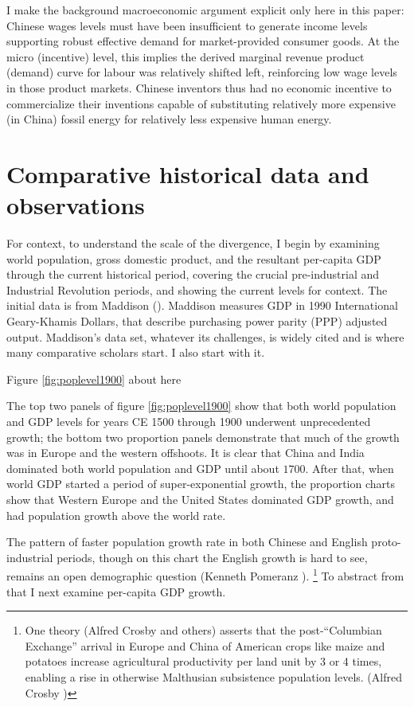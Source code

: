 \documentclass[12pt]{article}
\numberwithin{equation}{section}
\begin{document}
	I make the background macroeconomic argument explicit only here in this paper: Chinese wages levels must have been insufficient to generate income levels supporting robust effective demand for market-provided consumer goods. At the micro (incentive) level, this implies the derived marginal revenue product (demand) curve for labour was relatively shifted left, reinforcing low wage levels in those product markets. Chinese inventors thus had no economic incentive to commercialize their inventions capable of substituting relatively more expensive (in China) fossil energy for relatively less expensive human energy.
	
	\section*{Comparative historical data and observations}
	
		For context, to understand the scale of the divergence, I begin by examining world population, gross domestic product, and the resultant per-capita GDP through the current historical period, covering the crucial pre-industrial and Industrial Revolution periods, and showing the current levels for context. The initial data is from Maddison (\citeyear{maddison_maddison_2010}). Maddison measures GDP in 1990 International Geary-Khamis Dollars, that describe purchasing power parity (PPP) adjusted output. Maddison's data set, whatever its challenges, is widely cited and is where many comparative scholars start. I also start with it. 

\begin{center}		
Figure \ref{fig:poplevel1900} about here		
\end{center}
 				
		The top two panels of figure \ref{fig:poplevel1900} show that both world population and GDP levels for years CE 1500 through 1900 underwent unprecedented growth; the bottom two proportion panels demonstrate that much of the growth was in Europe and the western offshoots. It is clear that China and India dominated both world population and GDP until about $1700$. After that, when world GDP started a period of super-exponential growth, the proportion charts show that Western Europe and the United States dominated GDP growth, and had population growth above the world rate.
		
		The pattern of faster population growth rate in both Chinese and English proto-industrial periods, though on this chart the English growth is hard to see, remains an open demographic question (Kenneth Pomeranz \citeyear[p.~22]{pomeranz_great_2001}).  \footnote{One theory (Alfred Crosby and others) asserts that the post-``Columbian Exchange'' arrival in Europe and China of American crops like maize and potatoes increase agricultural productivity per land unit by 3 or 4 times, enabling a rise in otherwise Malthusian subsistence population levels.  (Alfred Crosby \citeyear{crosby_columbian_1972})} To abstract from that I next examine per-capita GDP growth.
		
\end{document}
